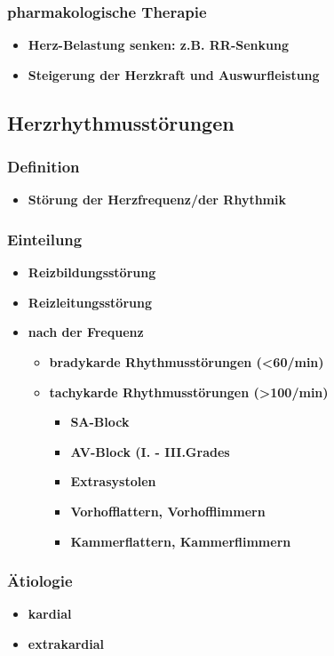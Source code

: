 		\subsubsection{pharmakologische Therapie}
			\begin{itemize}
				\item \textbf{Herz-Belastung senken: z.B. RR-Senkung}
				\item \textbf{Steigerung der Herzkraft und Auswurfleistung}
			\end{itemize}
	\subsection{Herzrhythmusstörungen}
		\subsubsection{Definition}
			\begin{itemize}
				\item \textbf{Störung der Herzfrequenz/der Rhythmik}
			\end{itemize}
		\subsubsection{Einteilung}
			\begin{itemize}
				\item \textbf{Reizbildungsstörung}
				\item \textbf{Reizleitungsstörung}
				\item \textbf{nach der Frequenz}
					\begin{itemize}
						\item \textbf{bradykarde Rhythmusstörungen (<60/min)}
						\item \textbf{tachykarde Rhythmusstörungen (>100/min)}
							\begin{itemize}
								\item \textbf{SA-Block}
								\item \textbf{AV-Block (I. - III.Grades}
								\item \textbf{Extrasystolen}
								\item \textbf{Vorhofflattern, Vorhofflimmern}
								\item \textbf{Kammerflattern, Kammerflimmern}								
							\end{itemize}
					\end{itemize}
			\end{itemize}
		\subsubsection{Ätiologie}
			\begin{itemize}
				\item \textbf{kardial}
				\item \textbf{extrakardial}
			\end{itemize}
